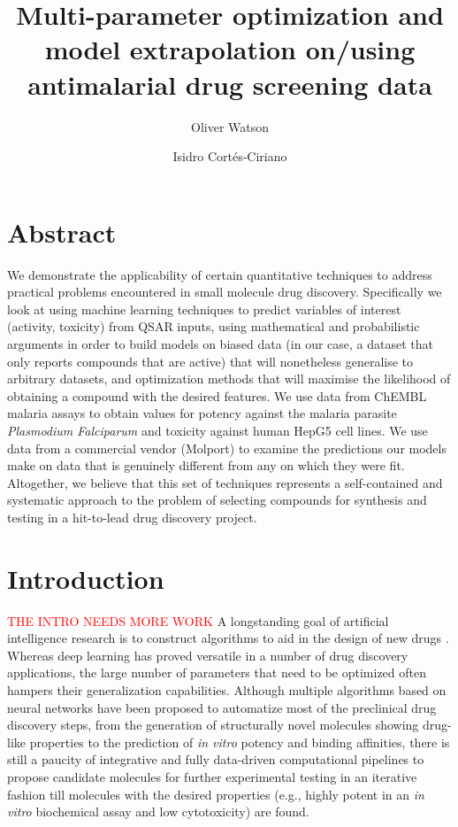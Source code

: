\documentclass{article}
\title{Multi-parameter optimization and model extrapolation on/using antimalarial drug screening data}
\author[1]{Oliver Watson}
\author[2]{Isidro Cortés-Ciriano}
\affil[1]{Evariste Technologies Ltd}
\affil[2]{Centre for Molecular Informatics, Department of Chemistry, University of Cambridge, Lensfield Road, Cambridge, CB2 1EW, United Kingdom.}
\begin{document}

\maketitle

\section{Abstract}

We demonstrate the applicability of certain quantitative techniques to address practical problems encountered in small molecule drug discovery.  Specifically we look at using machine learning techniques to predict variables of interest (activity, toxicity) from QSAR inputs, using mathematical and probabilistic arguments in order to build models on biased data (in our case, a dataset that only reports compounds that are active) that will nonetheless generalise to arbitrary datasets, and optimization methods that will maximise the likelihood of obtaining a compound with the desired features.  We use data from ChEMBL malaria assays to obtain values for potency against the malaria parasite \textit{Plasmodium Falciparum} and toxicity against human HepG5 cell lines.  We use data from a commercial vendor (Molport) to examine the predictions our models make on data that is genuinely different from any on which they were fit. Altogether, we believe that this set of techniques represents a self-contained and systematic approach to the problem of selecting compounds for synthesis and testing in a hit-to-lead drug discovery project.
\newpage


\section{Introduction}
\textcolor{red}{THE INTRO NEEDS MORE WORK}
A longstanding goal of artificial intelligence research is to construct algorithms 
to aid in the design of new drugs \cite{Gawehn2016,Chen2018}. 
Whereas deep learning has proved versatile in a number of drug discovery applications\cite{Chen2018}, 
the large number of parameters that need to be optimized often hampers their generalization capabilities. Although multiple algorithms based on neural networks have been proposed to automatize most of the preclinical drug discovery steps, from the generation of structurally novel molecules showing drug-like properties\cite{Kang2018} to the prediction of {\it in vitro} potency and binding affinities\cite{Ozturk2018}, there is still a paucity of integrative and fully data-driven computational pipelines to propose candidate molecules for further experimental testing in an iterative fashion till molecules with the desired properties (e.g., highly potent in an {\it in vitro} biochemical assay and low cytotoxicity) are found.
\end{document}
